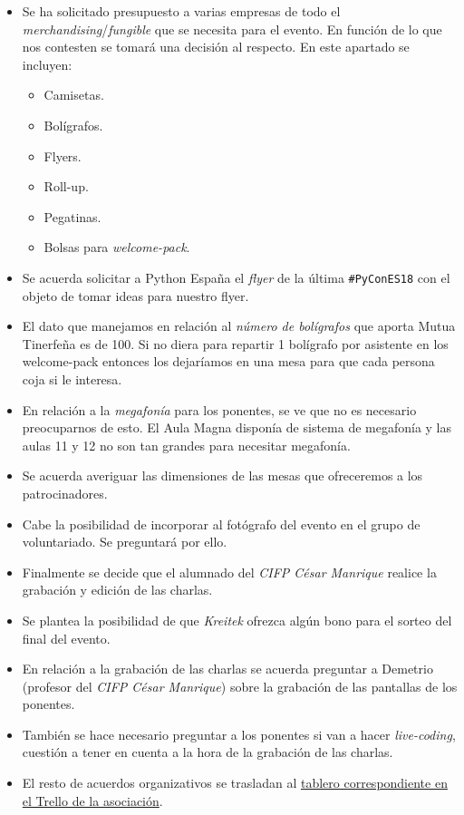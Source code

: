 \documentclass[a4paper, 12pt]{article}
\begin{document}
\begin{itemize}
    \item Se ha solicitado presupuesto a varias empresas de todo el \textit{merchandising}/\textit{fungible} que se necesita para el evento. En función de lo que nos contesten se tomará una decisión al respecto. En este apartado se incluyen:
    \begin{itemize}
        \item Camisetas.
        \item Bolígrafos.
        \item Flyers.
        \item Roll-up.
        \item Pegatinas.
        \item Bolsas para \textit{welcome-pack}.
    \end{itemize}
    \item Se acuerda solicitar a Python España el \textit{flyer} de la última \texttt{\#PyConES18} con el objeto de tomar ideas para nuestro flyer.
    \item El dato que manejamos en relación al \textit{número de bolígrafos} que aporta Mutua Tinerfeña es de 100. Si no diera para repartir 1 bolígrafo por asistente en los welcome-pack entonces los dejaríamos en una mesa para que cada persona coja si le interesa.
    \item En relación a la \textit{megafonía} para los ponentes, se ve que no es necesario preocuparnos de esto. El Aula Magna disponía de sistema de megafonía y las aulas 11 y 12 no son tan grandes para necesitar megafonía.
    \item Se acuerda averiguar las dimensiones de las mesas que ofreceremos a los patrocinadores.
    \item Cabe la posibilidad de incorporar al fotógrafo del evento en el grupo de voluntariado. Se preguntará por ello.
    \item Finalmente se decide que el alumnado del \textit{CIFP César Manrique} realice la grabación y edición de las charlas.
    \item Se plantea la posibilidad de que \textit{Kreitek} ofrezca algún bono para el sorteo del final del evento.
    \item En relación a la grabación de las charlas se acuerda preguntar a Demetrio (profesor del \textit{CIFP César Manrique}) sobre la grabación de las pantallas de los ponentes.
    \item También se hace necesario preguntar a los ponentes si van a hacer \textit{live-coding}, cuestión a tener en cuenta a la hora de la grabación de las charlas.
    \item El resto de acuerdos organizativos se trasladan al \href{https://trello.com/b/HrpdbSYG/pyday-2018}{tablero correspondiente en el Trello de la asociación}.
\end{itemize}
\end{document}
